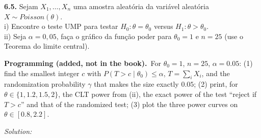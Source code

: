 \documentclass[11pt,a4paper]{article}
\newif\ifsolucoes
\newcommand{\espacoresol}{4.5cm}   %
\numberwithin{equation}{questao}   %
\newcommand{\programacao}{\par\smallskip\noindent\textbf{Programming (added, not in the book).}~}
\newcommand{\resolespaco}{\ifsolucoes\else\par\textit{Solution:}\vspace{\espacoresol}\par\fi}
\newcommand{\1}{\mathbf{1}}
\begin{document}
\begin{otherlanguage}{brazil}
\textbf{6.5.} Sejam $X_1,\dots,X_n$ uma amostra aleatória da variável aleatória $X\sim\mathit{Poisson}(\theta)$.\\
i) Encontre o teste UMP para testar $H_0:\theta=\theta_0$ versus $H_1:\theta>\theta_0$.\\
ii) Seja $\alpha=0,05$, faça o gráfico da função poder para $\theta_0=1$ e $n=25$ (use o Teorema
do limite central).
\end{otherlanguage}
\programacao For $\theta_0=1$, $n=25$, $\alpha=0.05$: (1) find the smallest integer $c$ with
$P(T>c\mid\theta_0)\le\alpha$, $T=\sum_iX_i$, and the randomization probability $\gamma$ that makes
the size exactly $0.05$; (2) print, for $\theta\in\{1,1.2,1.5,2\}$, the CLT power from (ii), the
exact power of the test ``reject if $T>c$'' and that of the randomized test; (3) plot the three
power curves on $\theta\in[0.8,2.2]$.
\resolespaco
\end{document}
